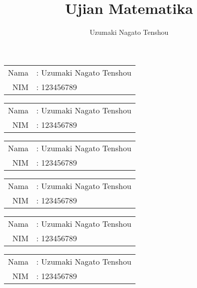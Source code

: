 \documentclass[11pt,a4paper]{article}
\author{Uzumaki Nagato Tenshou}
\title{Ujian Matematika}
\date{}
\theoremstyle{plain}
\theoremstyle{definition}
\theoremstyle{remark}
\begin{document}
\pagestyle{fancy}
\fancyhf{}
\rfoot{\thepage}
\renewcommand{\headrulewidth}{0pt}
\renewcommand{\footrulewidth}{0pt}

 
\begin{flushright}
\begin{tabular}{rl}
Nama &: Uzumaki Nagato Tenshou\\
NIM  &: 123456789 
\end{tabular}
\end{flushright}


\newpage
 
\begin{flushright}
	\begin{tabular}{rl}
		Nama &: Uzumaki Nagato Tenshou\\
		NIM  &: 123456789 
	\end{tabular}
\end{flushright}

\newpage
 
\begin{flushright}
	\begin{tabular}{rl}
		Nama &: Uzumaki Nagato Tenshou\\
		NIM  &: 123456789 
	\end{tabular}
\end{flushright}


\newpage
 
\begin{flushright}
	\begin{tabular}{rl}
		Nama &: Uzumaki Nagato Tenshou\\
		NIM  &: 123456789 
	\end{tabular}
\end{flushright}


\newpage
 
\begin{flushright}
	\begin{tabular}{rl}
		Nama &: Uzumaki Nagato Tenshou\\
		NIM  &: 123456789 
	\end{tabular}
\end{flushright}


\newpage
 
\begin{flushright}
	\begin{tabular}{rl}
		Nama &: Uzumaki Nagato Tenshou\\
		NIM  &: 123456789 
	\end{tabular}
\end{flushright}
\end{document}
